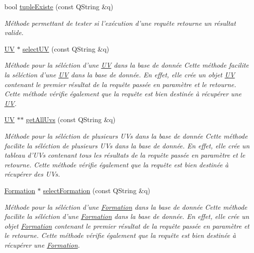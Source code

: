 \begin{DoxyCompactItemize}
bool \hyperlink{class_interface_s_q_l_a5da42744b61213a08bb5128f8e6cded7}{tuple\-Existe} (const Q\-String \&q)
\begin{DoxyCompactList}\small\item\em Méthode permettant de tester si l'exécution d'une requête retourne un résultat valide. \end{DoxyCompactList}\item 
\hyperlink{class_u_v}{U\-V} $\ast$ \hyperlink{class_interface_s_q_l_a20865b643ac19560f704bf6d27700de4}{select\-U\-V} (const Q\-String \&q)
\begin{DoxyCompactList}\small\item\em Méthode pour la séléction d'une \hyperlink{class_u_v}{U\-V} dans la base de donnée Cette méthode facilite la séléction d'une \hyperlink{class_u_v}{U\-V} dans la base de donnée. En effet, elle crée un objet \hyperlink{class_u_v}{U\-V} contenant le premier résultat de la requête passée en paramètre et le retourne. Cette méthode vérifie également que la requête est bien destinée à récupérer une \hyperlink{class_u_v}{U\-V}. \end{DoxyCompactList}\item 
\hyperlink{class_u_v}{U\-V} $\ast$$\ast$ \hyperlink{class_interface_s_q_l_a5ad330fd7f32518b0295cea673fc0754}{get\-All\-Uvs} (const Q\-String \&q)
\begin{DoxyCompactList}\small\item\em Méthode pour la séléction de plusieurs U\-Vs dans la base de donnée Cette méthode facilite la séléction de plusieurs U\-Vs dans la base de donnée. En effet, elle crée un tableau d'U\-Vs contenant tous les résultats de la requête passée en paramètre et le retourne. Cette méthode vérifie également que la requête est bien destinée à récupérer des U\-Vs. \end{DoxyCompactList}\item 
\hyperlink{class_formation}{Formation} $\ast$ \hyperlink{class_interface_s_q_l_a4ab411df432ca25ece4c198ba21f1884}{select\-Formation} (const Q\-String \&q)
\begin{DoxyCompactList}\small\item\em Méthode pour la séléction d'une \hyperlink{class_formation}{Formation} dans la base de donnée Cette méthode facilite la séléction d'une \hyperlink{class_formation}{Formation} dans la base de donnée. En effet, elle crée un objet \hyperlink{class_formation}{Formation} contenant le premier résultat de la requête passée en paramètre et le retourne. Cette méthode vérifie également que la requête est bien destinée à récupérer une \hyperlink{class_formation}{Formation}. \end{DoxyCompactList}\item 
$$
\end{DoxyCompactItemize}
